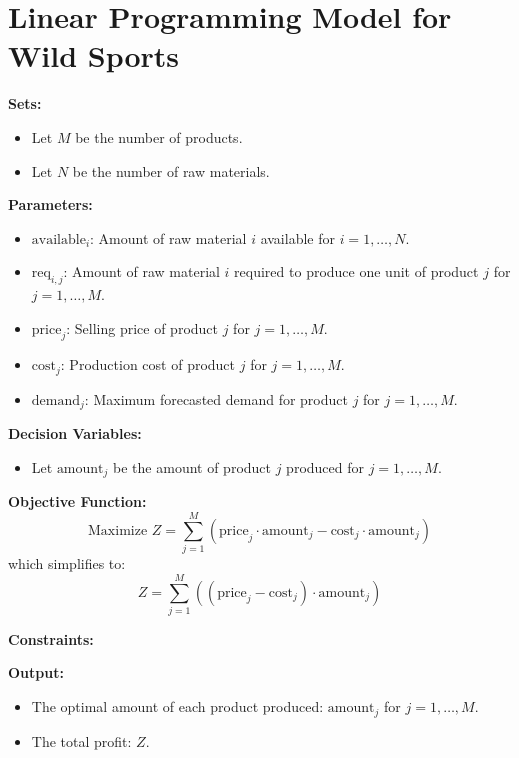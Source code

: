 \documentclass{article}
\begin{document}
\section*{Linear Programming Model for Wild Sports}

\textbf{Sets:}
\begin{itemize}
    \item Let \( M \) be the number of products.
    \item Let \( N \) be the number of raw materials.
\end{itemize}

\textbf{Parameters:}
\begin{itemize}
    \item \( \text{available}_i \): Amount of raw material \( i \) available for \( i = 1, \ldots, N \).
    \item \( \text{req}_{i,j} \): Amount of raw material \( i \) required to produce one unit of product \( j \) for \( j = 1, \ldots, M \).
    \item \( \text{price}_j \): Selling price of product \( j \) for \( j = 1, \ldots, M \).
    \item \( \text{cost}_j \): Production cost of product \( j \) for \( j = 1, \ldots, M \).
    \item \( \text{demand}_j \): Maximum forecasted demand for product \( j \) for \( j = 1, \ldots, M \).
\end{itemize}

\textbf{Decision Variables:}
\begin{itemize}
    \item Let \( \text{amount}_j \) be the amount of product \( j \) produced for \( j = 1, \ldots, M \).
\end{itemize}

\textbf{Objective Function:}
\[
\text{Maximize } Z = \sum_{j=1}^{M} \left( \text{price}_j \cdot \text{amount}_j - \text{cost}_j \cdot \text{amount}_j \right)
\]
which simplifies to:
\[
Z = \sum_{j=1}^{M} \left( (\text{price}_j - \text{cost}_j) \cdot \text{amount}_j \right)
\]

\textbf{Constraints:}
\]

\textbf{Output:}
\begin{itemize}
    \item The optimal amount of each product produced: \( \text{amount}_j \) for \( j = 1, \ldots, M \).
    \item The total profit: \( Z \).
\end{itemize}
\end{document}
